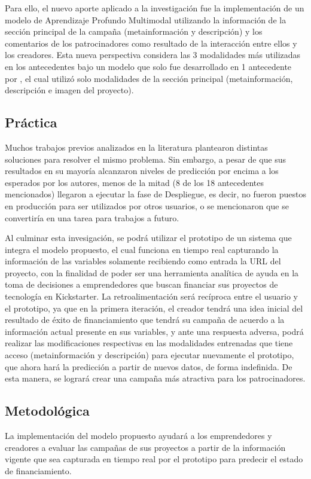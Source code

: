 Para ello, el nuevo aporte aplicado a la investigación fue la implementación de un modelo de Aprendizaje Profundo Multimodal utilizando la información de la sección principal de la campaña (metainformación y descripción) y los comentarios de los patrocinadores como resultado de la interacción entre ellos y los creadores. Esta nueva perspectiva considera las 3 modalidades más utilizadas en los antecedentes bajo un modelo que solo fue desarrollado en 1 antecedente por \cite{pr_cheng2019deeplearning}, el cual utilizó solo modalidades de la sección principal (metainformación, descripción e imagen del proyecto).

\subsection{Práctica}
Muchos trabajos previos analizados en la literatura plantearon distintas soluciones para resolver el mismo problema. Sin embargo, a pesar de que sus resultados en su mayoría alcanzaron niveles de predicción por encima a los esperados por los autores, menos de la mitad (8 de los 18 antecedentes mencionados) llegaron a ejecutar la fase de Despliegue, es decir, no fueron puestos en producción para ser utilizados por otros usuarios, o se mencionaron que se convertiría en una tarea para trabajos a futuro.

Al culminar esta invesigación, se podrá utilizar el prototipo de un sistema que integra el modelo propuesto, el cual funciona en tiempo real capturando la información de las variables solamente recibiendo como entrada la URL del proyecto, con la finalidad de poder ser una herramienta analítica de ayuda en la toma de decisiones a emprendedores que buscan financiar sus proyectos de tecnología en Kickstarter. La retroalimentación será recíproca entre el usuario y el prototipo, ya que en la primera iteración, el creador tendrá una idea inicial del resultado de éxito de financiamiento que tendrá su campaña de acuerdo a la información actual presente en sus variables, y ante una respuesta adversa, podrá realizar las modificaciones respectivas en las modalidades entrenadas que tiene acceso (metainformación y descripción) para ejecutar nuevamente el prototipo, que ahora hará la predicción a partir de nuevos datos, de forma indefinida. De esta manera, se logrará crear una campaña más atractiva para los patrocinadores.

\subsection{Metodológica}
La implementación del modelo propuesto ayudará a los emprendedores y creadores a evaluar las campañas de sus proyectos a partir de la información vigente que sea capturada en tiempo real por el prototipo para predecir el estado de financiamiento.

